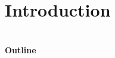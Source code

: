 \documentclass[12pt]{article}
\begin{document}
\maketitle

\section{Introduction}

\begin{lstlisting} 
\end{lstlisting} 

\paragraph{Outline}



\end{document}
